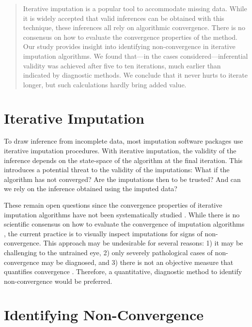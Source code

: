 \documentclass{article}
\begin{document}
\begin{abstract}
Iterative imputation is a popular tool to accommodate missing data. While it is widely accepted that valid inferences can be obtained with this technique, these inferences all rely on algorithmic convergence. There is no consensus on how to evaluate the convergence properties of the method. Our study provides insight into identifying non-convergence in iterative imputation algorithms. We found that---in the cases considered---inferential validity was achieved after five to ten iterations, much earlier than indicated by diagnostic methods. We conclude that it never hurts to iterate longer, but such calculations hardly bring added value.
\end{abstract}

\setcounter{footnote}{2}

\section{Iterative Imputation}
\label{intro}

To draw inference from incomplete data, most imputation software packages use iterative imputation procedures. With iterative imputation, the validity of the inference depends on the state-space of the algorithm at the final iteration. This introduces a potential threat to the validity of the imputations: What if the algorithm has not converged? Are the imputations then to be trusted? And can we rely on the inference obtained using the imputed data?

These remain open questions since the convergence properties of iterative imputation algorithms have not been systematically studied \citep[\(\S\) 6.5.2]{buur18}. While there is no scientific consensus on how to evaluate the convergence of imputation algorithms \citep{zhu15, taka17}, the current practice is to visually inspect imputations for signs of non-convergence. This approach may be undesirable for several reasons: 1) it may be challenging to the untrained eye, 2) only severely pathological cases of non-convergence may be diagnosed, and 3) there is not an objective measure that quantifies convergence \citep[\(\S\) 6.5.2]{buur18}. Therefore, a quantitative, diagnostic method to identify non-convergence would be preferred. 

\section{Identifying Non-Convergence}
\label{methods}
\end{document}
